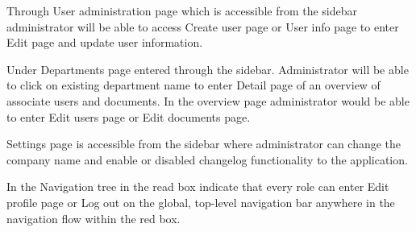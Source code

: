 Through User administration page which is accessible from the sidebar administrator will be able to access Create user page or User info page to enter Edit page and update user information. 

Under Departments page entered through the sidebar. 
Administrator will be able to click on existing department name to enter Detail page of an overview of associate users and documents. 
In the overview page administrator would be able to enter Edit users page or Edit documents page. 

Settings page is accessible from the sidebar where administrator can change the company name and enable or disabled changelog functionality to the application. 

In the Navigation tree in  the read box indicate that every role can enter Edit profile page or Log out on the global, top-level navigation bar anywhere in the navigation flow within the red box. 